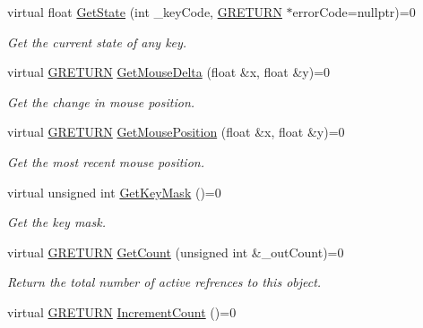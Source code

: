 \begin{DoxyCompactItemize}
\item 
virtual float \hyperlink{class_g_w_1_1_c_o_r_e_1_1_g_input_a17eed501af7818dc48afd4e3dbdab331}{Get\+State} (int \+\_\+key\+Code, \hyperlink{namespace_g_w_a69b1aaebac1cac8049825f035884c95b}{G\+R\+E\+T\+U\+RN} $\ast$error\+Code=nullptr)=0
\begin{DoxyCompactList}\small\item\em Get the current state of any key. \end{DoxyCompactList}\item 
virtual \hyperlink{namespace_g_w_a69b1aaebac1cac8049825f035884c95b}{G\+R\+E\+T\+U\+RN} \hyperlink{class_g_w_1_1_c_o_r_e_1_1_g_input_a570f179fb0fc093d3f6422f9c170efeb}{Get\+Mouse\+Delta} (float \&x, float \&y)=0
\begin{DoxyCompactList}\small\item\em Get the change in mouse position. \end{DoxyCompactList}\item 
virtual \hyperlink{namespace_g_w_a69b1aaebac1cac8049825f035884c95b}{G\+R\+E\+T\+U\+RN} \hyperlink{class_g_w_1_1_c_o_r_e_1_1_g_input_aa62945d29410ef2afad6ed39e0ff6575}{Get\+Mouse\+Position} (float \&x, float \&y)=0
\begin{DoxyCompactList}\small\item\em Get the most recent mouse position. \end{DoxyCompactList}\item 
virtual unsigned int \hyperlink{class_g_w_1_1_c_o_r_e_1_1_g_input_ab634a00fa9e5a12142bf6d50c112a0b3}{Get\+Key\+Mask} ()=0
\begin{DoxyCompactList}\small\item\em Get the key mask. \end{DoxyCompactList}\item 
virtual \hyperlink{namespace_g_w_a69b1aaebac1cac8049825f035884c95b}{G\+R\+E\+T\+U\+RN} \hyperlink{class_g_w_1_1_c_o_r_e_1_1_g_interface_a80f212dcdf60202cf9da49405863d1d5}{Get\+Count} (unsigned int \&\+\_\+out\+Count)=0
\begin{DoxyCompactList}\small\item\em Return the total number of active refrences to this object. \end{DoxyCompactList}\item 
virtual \hyperlink{namespace_g_w_a69b1aaebac1cac8049825f035884c95b}{G\+R\+E\+T\+U\+RN} \hyperlink{class_g_w_1_1_c_o_r_e_1_1_g_interface_a3e04e58eef4f3e3f56ff7fb751194c37}{Increment\+Count} ()=0

\end{DoxyCompactItemize}
